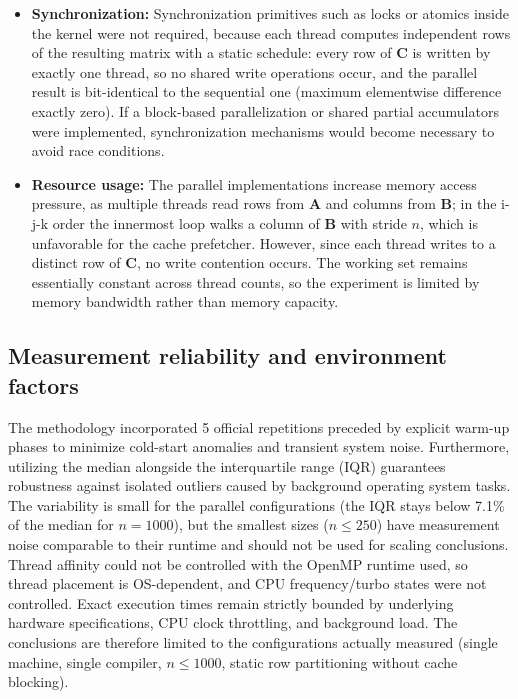 \documentclass[12pt,a4paper]{article}
\begin{document}
\begin{itemize}
they are complementary rather than substitutes. The loop reorder alone ---
before any vector instruction executes --- accounts for $3\times$, a reminder
that ``vectorizable'' often means ``cache-friendly'' at the same time.
\item \textbf{Synchronization:} Synchronization primitives such as locks or
atomics inside the kernel were not required, because each thread computes
independent rows of the resulting matrix with a static schedule: every row
of $\mathbf{C}$ is written by exactly one thread, so no shared write
operations occur, and the parallel result is bit-identical to the sequential
one (maximum elementwise difference exactly zero). If a block-based
parallelization or shared partial accumulators were implemented,
synchronization mechanisms would become necessary to avoid race conditions.
\item \textbf{Resource usage:} The parallel implementations increase memory
access pressure, as multiple threads read rows from $\mathbf{A}$ and
columns from $\mathbf{B}$; in the i-j-k order the innermost loop walks a
column of $\mathbf{B}$ with stride $n$, which is unfavorable for the cache
prefetcher. However, since each thread writes to a distinct row of
$\mathbf{C}$, no write contention occurs. The working set remains
essentially constant across thread counts, so the experiment is limited by
memory bandwidth rather than memory capacity.
\end{itemize}

\subsection{Measurement reliability and environment factors}
\label{sec:reliability}

The methodology incorporated 5 official repetitions preceded by explicit
warm-up phases to minimize cold-start anomalies and transient system noise.
Furthermore, utilizing the median alongside the interquartile range (IQR)
guarantees robustness against isolated outliers caused by background
operating system tasks. The variability is small for the parallel
configurations (the IQR stays below 7.1\% of the median for $n = 1000$), but
the smallest sizes ($n \leq 250$) have measurement noise comparable to their
runtime and should not be used for scaling conclusions. Thread affinity
could not be controlled with the OpenMP runtime used, so thread placement is
OS-dependent, and CPU frequency/turbo states were not controlled. Exact
execution times remain strictly bounded by underlying hardware
specifications, CPU clock throttling, and background load. The conclusions
are therefore limited to the configurations actually measured (single
machine, single compiler, $n \leq 1000$, static row partitioning without
cache blocking).
\end{document}
